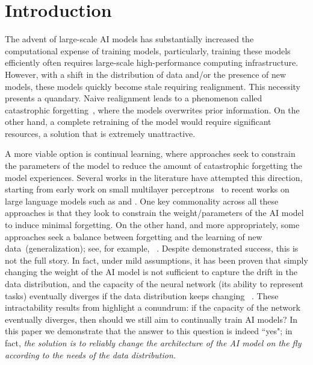 \section{Introduction}
The advent of large-scale AI models has substantially increased the computational expense of training models, particularly, training these models efficiently often requires large-scale high-performance computing infrastructure. However, with a shift in the distribution of data and/or the presence of new models, these models quickly become stale
requiring realignment. This necessity presents a quandary. Naive realignment leads to a phenomenon called catastrophic forgetting~\cite{raghavan2021formalizing}, where the models overwrites prior information. On the other hand, a complete retraining of the model would require significant resources, a solution that is extremely unattractive. 

A more viable option is  continual learning, where approaches seek to constrain the parameters of the model to reduce the amount of catastrophic forgetting the model experiences. Several works in the literature have attempted this direction, starting from early work on small multilayer perceptrons~\cite{mccloskey1989catastrophic} to recent works on large language models such as \cite{luo2025empirical, lai2025reinforcement, biderman2024lora} and \cite{lin2025continual}. One key commonality across all  these approaches is that they look to constrain the weight/parameters of the AI model to induce minimal forgetting. On the other hand, and more appropriately, some approaches seek a balance between forgetting and the learning of new data~(generalization); see, for example, ~\cite{raghavan2021formalizing, lu2025rethinking,lin2023theory}. Despite demonstrated success, this is not the full story. In fact,  under mild assumptions, it has been proven that simply changing the weight of the AI model is not sufficient to capture the drift in the data distribution, and the capacity of the neural network (its ability to represent tasks) eventually diverges if the data distribution keeps changing ~\cite{chakraborty2025understanding}. These intractability results from \cite{chakraborty2025understanding} highlight a conundrum:  if the capacity of the network eventually diverges, then should we still aim to continually train AI models?
In this paper we demonstrate that the answer to this question is indeed ``yes"; in fact, \textit{the solution is to reliably change the architecture of the AI model on the fly according to the needs of the data distribution.} 

